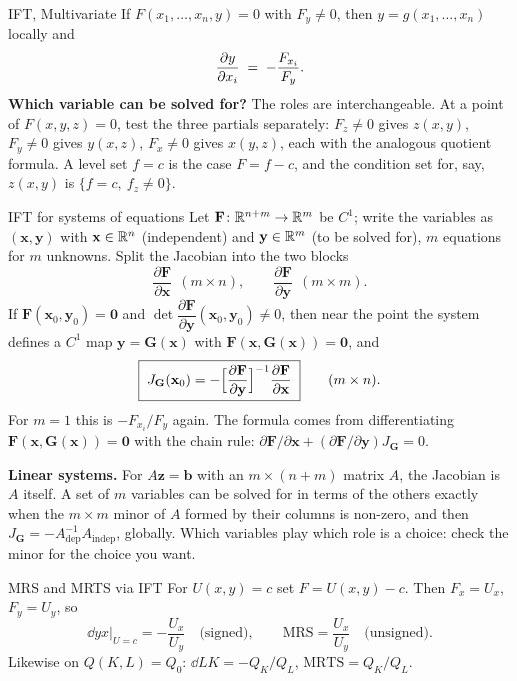 \begin{rulebox}{IFT, Multivariate}
If $F(x_{1},\ldots,x_{n},y)=0$ with $F_{y}\neq 0$, then
$y=g(x_{1},\ldots,x_{n})$ locally and
\[
  \frac{\partial y}{\partial x_{i}} \;=\; -\frac{F_{x_{i}}}{F_{y}} .
\]
\textbf{Which variable can be solved for?} The roles are interchangeable.
At a point of $F(x,y,z)=0$, test the three partials separately:
$F_{z}\neq0$ gives $z(x,y)$, $F_{y}\neq0$ gives $y(x,z)$, $F_{x}\neq0$ gives
$x(y,z)$, each with the analogous quotient formula. A level set $f=c$ is the
case $F=f-c$, and the condition set for, say, $z(x,y)$ is
$\{f=c,\ f_{z}\neq0\}$.
\end{rulebox}

\begin{rulebox}{IFT for systems of equations}
Let $\mathbf{F}\colon\mathbb{R}^{n+m}\to\mathbb{R}^{m}$ be $C^{1}$; write the variables as
$(\mathbf{x},\mathbf{y})$ with $\mathbf{x}\in\mathbb{R}^{n}$ (independent) and
$\mathbf{y}\in\mathbb{R}^{m}$ (to be solved for), $m$ equations for $m$ unknowns.
Split the Jacobian into the two blocks
\[
  \frac{\partial\mathbf{F}}{\partial\mathbf{x}}\ \ (m\times n),\qquad
  \frac{\partial\mathbf{F}}{\partial\mathbf{y}}\ \ (m\times m) .
\]
If $\mathbf{F}(\mathbf{x}_{0},\mathbf{y}_{0})=\mathbf{0}$ and
$\det\dfrac{\partial\mathbf{F}}{\partial\mathbf{y}}(\mathbf{x}_{0},
\mathbf{y}_{0})\neq0$, then near the point the system defines a $C^{1}$ map
$\mathbf{y}=\mathbf{G}(\mathbf{x})$ with
$\mathbf{F}(\mathbf{x},\mathbf{G}(\mathbf{x}))=\mathbf{0}$, and
\[
  \boxed{\;J_{\mathbf{G}}(\mathbf{x}_{0})
  =-\Bigl[\frac{\partial\mathbf{F}}{\partial\mathbf{y}}\Bigr]^{-1}
   \frac{\partial\mathbf{F}}{\partial\mathbf{x}}\;}\qquad(m\times n).
\]
For $m=1$ this is $-F_{x_{i}}/F_{y}$ again. The formula comes from
differentiating $\mathbf{F}(\mathbf{x},\mathbf{G}(\mathbf{x}))=\mathbf{0}$
with the chain rule:
$\partial\mathbf{F}/\partial\mathbf{x}+(\partial\mathbf{F}/\partial\mathbf{y})
J_{\mathbf{G}}=0$.

\textbf{Linear systems.} For $A\mathbf{z}=\mathbf{b}$ with an $m\times(n+m)$
matrix $A$, the Jacobian is $A$ itself. A set of $m$ variables can be solved
for in terms of the others exactly when the $m\times m$ minor of $A$ formed
by their columns is non-zero, and then
$J_{\mathbf{G}}=-A_{\mathrm{dep}}^{-1}A_{\mathrm{indep}}$, globally. Which
variables play which role is a choice: check the minor for the choice you
want.
\end{rulebox}

\begin{rulebox}{MRS and MRTS via IFT}
For $U(x,y)=c$ set $F=U(x,y)-c$. Then $F_{x}=U_{x}$, $F_{y}=U_{y}$, so
\[
  \dd{y}{x}\bigg|_{U=c} = -\frac{U_{x}}{U_{y}}\quad\text{(signed)},\qquad
  \mathrm{MRS} = \frac{U_{x}}{U_{y}}\quad\text{(unsigned)} .
\]
Likewise on $Q(K,L)=Q_{0}$: $\dd{L}{K}=-Q_{K}/Q_{L}$,
$\mathrm{MRTS}=Q_{K}/Q_{L}$.
\end{rulebox}

